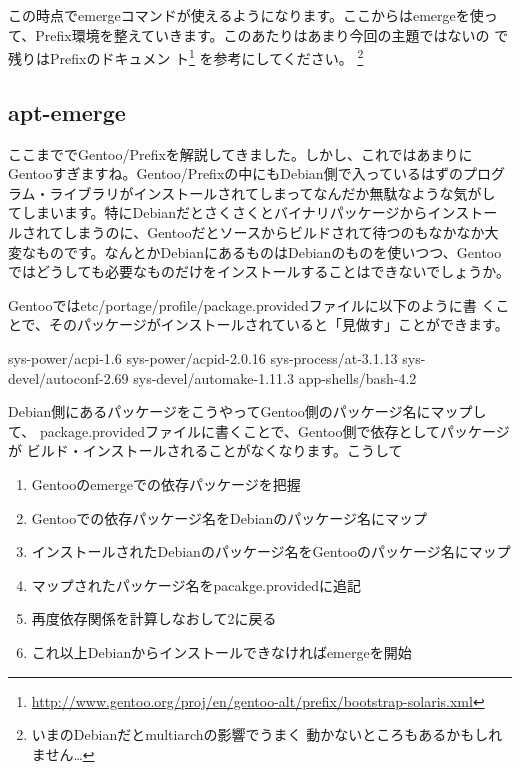 \documentclass[mingoth,a4paper]{jsarticle}
\begin{document}
この時点でemergeコマンドが使えるようになります。ここからはemergeを使っ
て、Prefix環境を整えていきます。このあたりはあまり今回の主題ではないの
で残りはPrefixのドキュメン
ト\footnote{\url{http://www.gentoo.org/proj/en/gentoo-alt/prefix/bootstrap-solaris.xml}}
を参考にしてください。 \footnote{いまのDebianだとmultiarchの影響でうまく
  動かないところもあるかもしれません…}

\subsection{apt-emerge}

ここまででGentoo/Prefixを解説してきました。しかし、これではあまりに
Gentooすぎますね。Gentoo/Prefixの中にもDebian側で入っているはずのプログ
ラム・ライブラリがインストールされてしまってなんだか無駄なような気がし
てしまいます。特にDebianだとさくさくとバイナリパッケージからインストー
ルされてしまうのに、Gentooだとソースからビルドされて待つのもなかなか大
変なものです。なんとかDebianにあるものはDebianのものを使いつつ、Gentoo
ではどうしても必要なものだけをインストールすることはできないでしょうか。

Gentooではetc/portage/profile/package.providedファイルに以下のように書
くことで、そのパッケージがインストールされていると「見做す」ことができます。

\begin{commandline}
sys-power/acpi-1.6
sys-power/acpid-2.0.16
sys-process/at-3.1.13
sys-devel/autoconf-2.69
sys-devel/automake-1.11.3
app-shells/bash-4.2
\end{commandline}

Debian側にあるパッケージをこうやってGentoo側のパッケージ名にマップして、
package.providedファイルに書くことで、Gentoo側で依存としてパッケージが
ビルド・インストールされることがなくなります。こうして

\begin{enumerate}
\item Gentooのemergeでの依存パッケージを把握
\item Gentooでの依存パッケージ名をDebianのパッケージ名にマップ
\item インストールされたDebianのパッケージ名をGentooのパッケージ名にマップ
\item マップされたパッケージ名をpacakge.providedに追記
\item 再度依存関係を計算しなおして2に戻る
\item これ以上Debianからインストールできなければemergeを開始
\end{enumerate}
\end{document}

